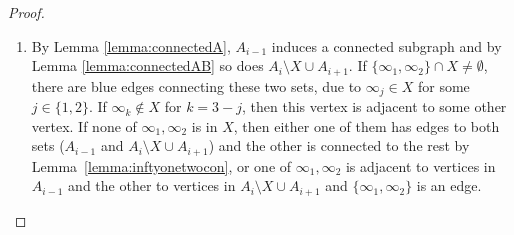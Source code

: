 \documentclass[11pt,a4paper]{article}
\begin{document}
\begin{proof}
\begin{enumerate}
    \item By Lemma \ref{lemma:connectedA}, $A_{i-1}$ induces a connected subgraph and by Lemma \ref{lemma:connectedAB} so does $A_{i} \setminus X \cup A_{i+1}$. If $\{ \infty_1, \infty_2 \} \cap X \neq \emptyset$, there are blue edges connecting these two sets, due to $\infty_j \in X$ for some $j \in \{ 1,2 \}$. If $\infty_k \not \in X$ for $k=3-j$, then this vertex is adjacent to some other vertex. If none of $\infty_1,\infty_2$ is in $X$, then either one of them has edges to both sets ($A_{i-1}$ and $A_{i} \setminus X \cup A_{i+1}$) and the other is connected to the rest by Lemma~\ref{lemma:inftyonetwocon}, or one of $\infty_1, \infty_2$ is adjacent to vertices in $A_{i-1}$ and the other to vertices in $A_{i} \setminus X \cup A_{i+1}$ and $\{ \infty_1, \infty_2 \}$ is an edge.




\end{enumerate}

\end{proof}
\end{document}
